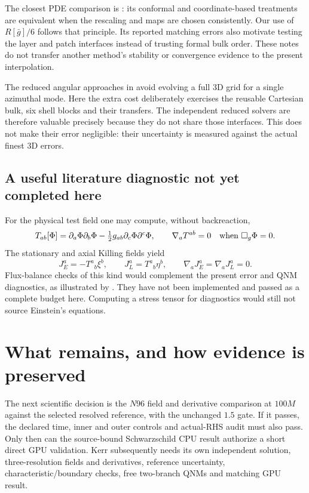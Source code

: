 \documentclass[11pt,letterpaper]{article}
\newcommand{\G}{\bar g}
\begin{document}
The closest PDE comparison is \cite{matching}: its conformal and coordinate-based treatments are equivalent when the rescaling and maps are chosen consistently. Our use of $R[\G]/6$ follows that principle. Its reported matching errors also motivate testing the layer and patch interfaces instead of trusting formal bulk order. These notes do not transfer another method's stability or convergence evidence to the present interpolation.

The reduced angular approaches in \cite{tails,macedo} avoid evolving a full 3D grid for a single azimuthal mode. Here the extra cost deliberately exercises the reusable Cartesian bulk, six shell blocks and their transfers. The independent reduced solvers are therefore valuable precisely because they do not share those interfaces. This does not make their error negligible: their uncertainty is measured against the actual finest 3D errors.

\clearpage
\subsection{A useful literature diagnostic not yet completed here}
For the physical test field one may compute, without backreaction,
\begin{equation}
 T_{ab}[\Phi]=\partial_a\Phi\partial_b\Phi-\tfrac12g_{ab}\partial_c\Phi\partial^c\Phi,
 \qquad \nabla_aT^{ab}=0\quad\hbox{when }\Box_g\Phi=0.
\end{equation}
The stationary and axial Killing fields yield
\begin{equation}
 J_E^a=-T^a{}_b\xi^b,\qquad J_L^a=T^a{}_b\eta^b,\qquad
 \nabla_aJ_E^a=\nabla_aJ_L^a=0.
\end{equation}
Flux-balance checks of this kind would complement the present error and QNM diagnostics, as illustrated by \cite{tails}. They have not been implemented and passed as a complete budget here. Computing a stress tensor for diagnostics would still not source Einstein's equations.

\section{What remains, and how evidence is preserved}
The next scientific decision is the $N96$ field and derivative comparison at $100M$ against the selected resolved reference, with the unchanged $1.5$ gate. If it passes, the declared time, inner and outer controls and actual-RHS audit must also pass. Only then can the source-bound Schwarzschild CPU result authorize a short direct GPU validation. Kerr subsequently needs its own independent solution, three-resolution fields and derivatives, reference uncertainty, characteristic/boundary checks, free two-branch QNMs and matching GPU result.
\end{document}
